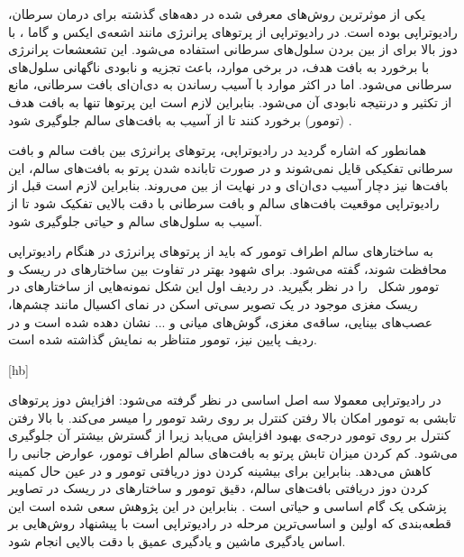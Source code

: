 

یکی از موثرترین روش‌های معرفی شده در دهه‌های گذشته برای درمان سرطان، رادیوتراپی	 بوده است. در رادیوتراپی از پرتوهای پرانرژی مانند اشعه‌ی ایکس	 و گاما	، با دوز	 بالا برای از بین بردن سلول‌های سرطانی استفاده می‌شود. این تشعشعات پرانرژی با برخورد به بافت هدف، در برخی موارد، باعث تجزیه و نابودی ناگهانی سلول‌های سرطانی می‌شود. اما در اکثر موارد با آسیب رساندن به دی‌ان‌ای بافت سرطانی، مانع از تکثیر و درنتیجه نابودی آن می‌شود. بنابراین لازم است این پرتوها تنها به بافت هدف (تومور) برخورد کنند تا از آسیب به بافت‌های سالم جلوگیری شود . 





همانطور که اشاره گردید در رادیوتراپی، پرتوهای پرانرژی بین بافت سالم و بافت سرطانی تفکیکی قایل نمی‌شوند و در صورت تابانده شدن پرتو به بافت‌های سالم، این بافت‌ها نیز دچار آسیب دی‌ان‌ای و در نهایت از بین می‌روند. بنابراین لازم است قبل از رادیوتراپی موقعیت بافت‌های سالم و بافت سرطانی با دقت بالایی تفکیک شود تا از آسیب به سلول‌های سالم و حیاتی جلوگیری شود.

به ساختارهای سالم اطراف تومور که باید از پرتوهای پرانرژی در هنگام رادیوتراپی محافظت شوند، گفته می‌شود. برای شهود بهتر در تفاوت بین ساختارهای در ریسک و تومور شکل‌~ را در نظر بگیرید. در ردیف اول این شکل نمونه‌هایی از ساختارهای در ریسک مغزی موجود در یک تصویر سی‌تی اسکن در نمای اکسیال مانند چشم‌ها، عصب‌های بینایی، ساقه‌ی مغزی، گوش‌های میانی و ... نشان دهده شده است و در ردیف پایین نیز، تومور متناظر به نمایش گذاشته شده است.

[hb]

در رادیوتراپی معمولا سه اصل اساسی در نظر گرفته می‌شود:
 افزایش دوز پرتوهای تابشی به تومور امکان بالا رفتن کنترل بر روی رشد تومور را میسر می‌کند.
 با بالا رفتن کنترل بر روی تومور درجه‌ی بهبود افزایش می‌یابد زیرا از گسترش بیشتر آن جلوگیری می‌شود.
 کم کردن میزان تابش پرتو به بافت‌های سالم اطراف تومور، عوارض جانبی را کاهش می‌دهد.
بنابراین برای بیشینه کردن دوز دریافتی تومور و در عین حال کمینه کردن دوز دریافتی بافت‌های سالم،  دقیق تومور و ساختارهای در ریسک در تصاویر پزشکی یک گام اساسی و حیاتی است . بنابراین در این پژوهش سعی شده است این قطعه‌بندی که اولین و اساسی‌ترین مرحله در رادیوتراپی است با پیشنهاد روش‌هایی بر اساس یادگیری ماشین و یادگیری عمیق با دقت بالایی انجام شود.
	

